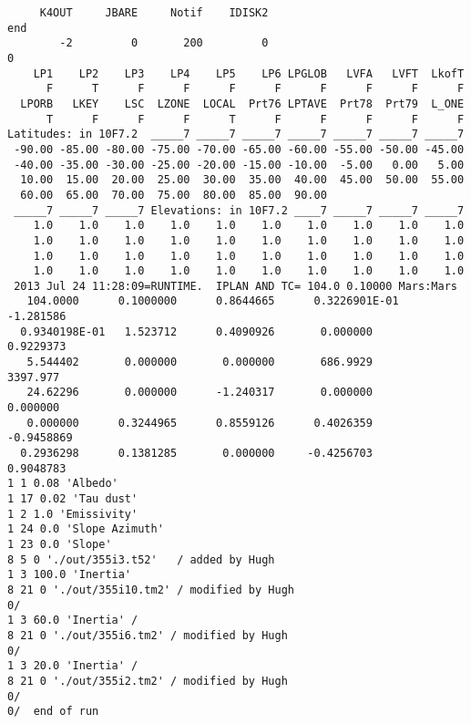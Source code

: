 \documentclass{article}
\begin{document}
\begin{verbatim}
     K4OUT     JBARE     Notif    IDISK2                                     end
        -2         0       200         0                                       0
    LP1    LP2    LP3    LP4    LP5    LP6 LPGLOB   LVFA   LVFT  LkofT          
      F      T      F      F      F      F      F      F      F      F          
  LPORB   LKEY    LSC  LZONE  LOCAL  Prt76 LPTAVE  Prt78  Prt79  L_ONE          
      T      F      F      F      T      F      F      F      F      F          
Latitudes: in 10F7.2  _____7 _____7 _____7 _____7 _____7 _____7 _____7          
 -90.00 -85.00 -80.00 -75.00 -70.00 -65.00 -60.00 -55.00 -50.00 -45.00
 -40.00 -35.00 -30.00 -25.00 -20.00 -15.00 -10.00  -5.00   0.00   5.00
  10.00  15.00  20.00  25.00  30.00  35.00  40.00  45.00  50.00  55.00
  60.00  65.00  70.00  75.00  80.00  85.00  90.00                               
 _____7 _____7 _____7 Elevations: in 10F7.2 ____7 _____7 _____7 _____7          
    1.0    1.0    1.0    1.0    1.0    1.0    1.0    1.0    1.0    1.0
    1.0    1.0    1.0    1.0    1.0    1.0    1.0    1.0    1.0    1.0
    1.0    1.0    1.0    1.0    1.0    1.0    1.0    1.0    1.0    1.0
    1.0    1.0    1.0    1.0    1.0    1.0    1.0    1.0    1.0    1.0
 2013 Jul 24 11:28:09=RUNTIME.  IPLAN AND TC= 104.0 0.10000 Mars:Mars           
   104.0000      0.1000000      0.8644665      0.3226901E-01  -1.281586         
  0.9340198E-01   1.523712      0.4090926       0.000000      0.9229373         
   5.544402       0.000000       0.000000       686.9929       3397.977         
   24.62296       0.000000      -1.240317       0.000000       0.000000         
   0.000000      0.3244965      0.8559126      0.4026359     -0.9458869         
  0.2936298      0.1381285       0.000000     -0.4256703      0.9048783
1 1 0.08 'Albedo'
1 17 0.02 'Tau dust'
1 2 1.0 'Emissivity'
1 24 0.0 'Slope Azimuth'
1 23 0.0 'Slope'
8 5 0 './out/355i3.t52'   / added by Hugh
1 3 100.0 'Inertia'
8 21 0 './out/355i10.tm2' / modified by Hugh
0/
1 3 60.0 'Inertia' /
8 21 0 './out/355i6.tm2' / modified by Hugh
0/
1 3 20.0 'Inertia' /
8 21 0 './out/355i2.tm2' / modified by Hugh
0/
0/  end of run
\end{verbatim}  
\end{document}
